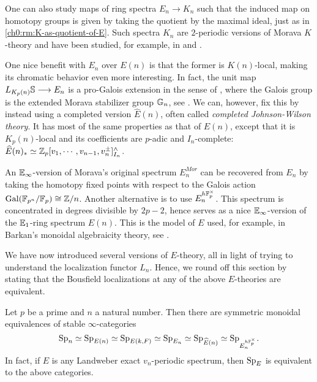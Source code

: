 \begin{remark}
    One can also study maps of ring spectra $E_n \longrightarrow K_n$ such that the induced map on homotopy groups is given by taking the quotient by the maximal ideal, just as in \cref{ch0:rm:K-as-quotient-of-E}. Such spectra $K_n$ are $2$-periodic versions of Morava $K$-theory and have been studied, for example, in \cite{hopkins-lurie_17} and \cite{barthel-pstragowski_2021}. 
\end{remark}

\begin{remark}
    One nice benefit with $E_n$ over $E(n)$ is that the former is $K(n)$-local, making its chromatic behavior even more interesting. In fact, the unit map $L_{K_p(n)}\S \longrightarrow E_n$ is a pro-Galois extension in the sense of \cite{rognes_08}, where the Galois group is the extended Morava stabilizer group $\G_n$, see \cite{devinatz-hopkins_2004}. We can, however, fix this by instead using a completed version $\widehat{E}(n)$, often called \emph{completed Johnson-Wilson theory}. It has most of the same properties as that of $E(n)$, except that it is $K_p(n)$-local and its coefficients are $p$-adic and $I_n$-complete: $\widehat{E}(n)_* \simeq \Z_p[v_1, \cdots, v_{n-1}, v_n^{\pm}]^\wedge_{I_n}$. 
\end{remark}

\begin{remark}
    An $\E_\infty$-version of Morava's original spectrum $E_n^{Mor}$ can be recovered from $E_n$ by taking the homotopy fixed points with respect to the Galois action $\mathrm{Gal}(\F_{p^n}/\F_p)\cong \Z/n$. Another alternative is to use $E_n^{h\F_p^\times}$. This spectrum is concentrated in degrees divisible by $2p-2$, hence serves as a nice $\E_\infty$-version of the $\E_1$-ring spectrum $E(n)$. This is the model of $E$ used, for example, in Barkan's monoidal algebraicity theory, see \cite{barkan_2023}. 
\end{remark}

We have now introduced several versions of $E$-theory, all in light of trying to understand the localization functor $L_n$. Hence, we round off this section by stating that the Bousfield localizations at any of the above $E$-theories are equivalent. 

\begin{proposition}
    \label{ch0:prop:all-E-local-cats-are-equivalent}
    Let $p$ be a prime and $n$ a natural number. Then there are symmetric monoidal equivalences of stable $\infty$-categories 
    $$\sp_n \simeq \sp_{E(n)} \simeq \sp_{E(k,F)}\simeq \sp_{E_n} \simeq \sp_{\widehat{E}(n)}\simeq \sp_{E_n^{h\F_p^\times}}.$$
    In fact, if $E$ is any Landweber exact $v_n$-periodic spectrum, then $\sp_E$ is equivalent to the above categories. 
\end{proposition}

